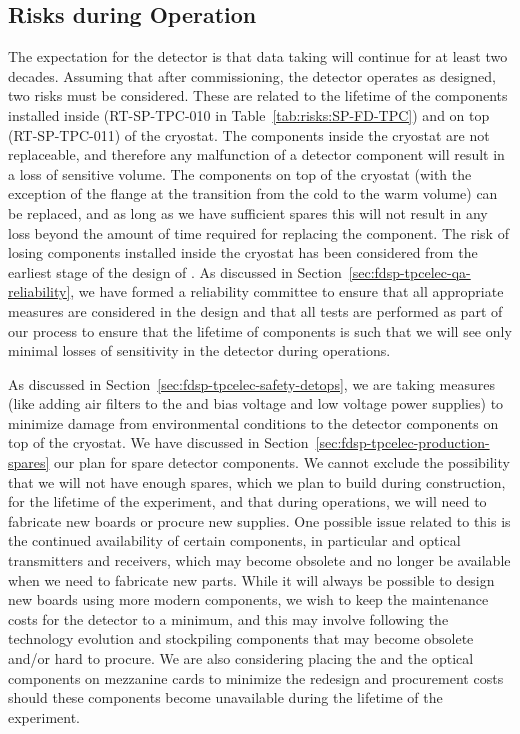 \subsection{Risks during Operation}
\label{sec:fdsp-tpcelec-risks-operations}

The expectation for the  detector is that data taking will continue
for at least two decades. Assuming that after commissioning, the
detector operates as designed, two risks must be considered.
These are related to the lifetime of the  components
installed inside (RT-SP-TPC-010 in Table~\ref{tab:risks:SP-FD-TPC}) and on top (RT-SP-TPC-011)
of the cryostat. The components inside the cryostat are not replaceable,
and therefore any malfunction of a detector component will result in
a loss of sensitive volume. The components on top of the cryostat
(with the exception of the flange at the transition from the cold to
the warm volume) can be replaced, and as long as we have sufficient
spares this will not result in any loss beyond the amount 
of time required for replacing the component. The risk of losing components installed inside the cryostat has been considered
from the earliest stage of the design of . As discussed
in Section~\ref{sec:fdsp-tpcelec-qa-reliability}, we have formed a 
reliability committee to ensure that all appropriate measures
are considered in the design and that all tests are performed
as part of our  process to ensure that the lifetime of components is
such that we will see only minimal losses of sensitivity in the 
detector during operations. 

As discussed in Section~\ref{sec:fdsp-tpcelec-safety-detops}, we
are taking measures (like adding air filters to the
 and bias voltage and low voltage power supplies) to
minimize damage from environmental conditions to the 
detector components on top of the cryostat. We have discussed in
Section~\ref{sec:fdsp-tpcelec-production-spares} our plan for 
spare detector components. We cannot exclude the possibility that we will not have enough
spares, which we plan to build during construction, for the lifetime of the experiment, and that during 
operations, we will need to fabricate new boards or procure new
supplies. One possible issue related to this is the 
continued availability of certain components, in particular
 and optical transmitters and receivers, which may 
become obsolete and no longer be available when we need to fabricate new
parts. While it will always be 
possible to design new boards using more modern components, we
wish to keep the maintenance costs for the detector to a minimum,
and this may involve following the technology evolution and stockpiling components that may become obsolete
and/or hard to procure. We are also considering placing the
 and the optical components on mezzanine cards
to minimize the redesign and procurement costs should these 
components become unavailable during the lifetime of the experiment.
